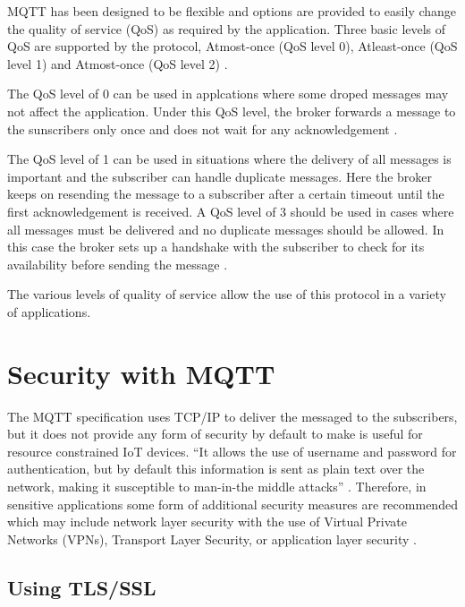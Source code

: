 \documentclass[sigconf]{acmart}
\begin{document}
MQTT has been designed to be flexible and options are provided to
easily change the quality of service (QoS) as required by the
application. Three basic levels of QoS are supported by the protocol,
Atmost-once (QoS level 0), Atleast-once (QoS level 1) and Atmost-once
(QoS level 2) \cite{hivemq-qos}\cite{python-paho-mqtt}.

The QoS level of 0 can be used in applcations where some droped
messages may not affect the application. Under this QoS level, the
broker forwards a message to the sunscribers only once and does not
wait for any acknowledgement \cite{hivemq-qos}
\cite{python-paho-mqtt}.

The QoS level of 1 can be used in situations where the delivery of all
messages is important and the subscriber can handle duplicate
messages. Here the broker keeps on resending the message to a
subscriber after a certain timeout until the first acknowledgement is
received. A QoS level of 3 should be used in cases where all messages
must be delivered and no duplicate messages should be allowed. In this
case the broker sets up a handshake with the subscriber to check for
its availability before sending the message \cite{hivemq-qos}
\cite{python-paho-mqtt}.

The various levels of quality of service allow the use of this
protocol in a variety of applications.

\section{Security with MQTT}

The MQTT specification uses TCP/IP to deliver the messaged to the
subscribers, but it does not provide any form of security by default
to make is useful for resource constrained IoT devices. ``It allows
the use of username and password for authentication, but by default
this information is sent as plain text over the network, making it
susceptible to man-in-the middle attacks''
\cite{iot-design-mqtt-security} \cite{mqtt-sec-ssl}. Therefore, in
sensitive applications some form of additional security measures are
recommended which may include network layer security with the use of
Virtual Private Networks (VPNs), Transport Layer Security, or
application layer security \cite{mqtt-sec-ssl}.

\subsection{Using TLS/SSL}
\end{document}
